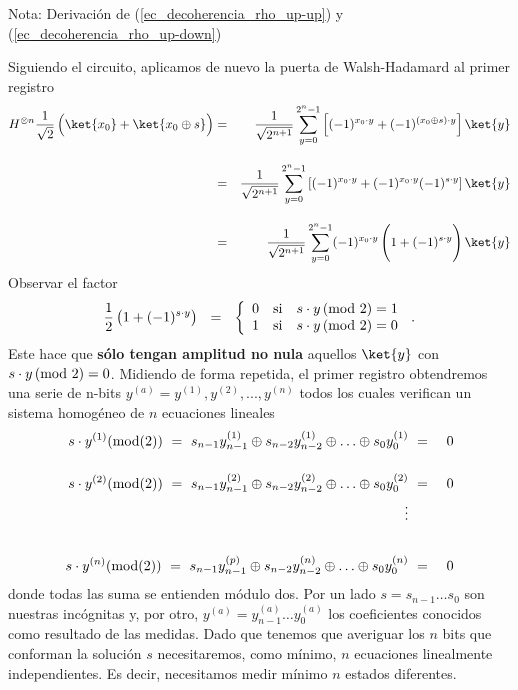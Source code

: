 \documentclass[a4paper,11pt]{book} %
\numberwithin{equation}{chapter}
\begin{document}
\begin{mybox_blue}{Nota: Derivación de (\ref{ec_decoherencia_rho_up-up}) y  (\ref{ec_decoherencia_rho_up-down})}
\begin{itemize}
	Siguiendo el circuito, aplicamos de nuevo la puerta de Walsh-Hadamard al primer registro 
	\begin{eqnarray}
	H^{\otimes n} \frac{1}{\sqrt{2}} \left( \rule{0mm}{4mm} \ket{x_0} + \ket{x_0 \oplus s} \right) &=& \frac{1}{\sqrt{2^{n+1}}} \sum_{y=0}^{2^n-1} \left[ (-1)^{x_0\cdot y} + (-1)^{(x_0\oplus s) \cdot y}\right]  \ket{y} \nonumber\\ 	\rule{0mm}{10mm}
	&=& \frac{1}{\sqrt{2^{n+1}}} \sum_{y=0}^{2^n-1} \left[ (-1)^{x_0\cdot y} + (-1)^{x_0 \cdot y}(-1)^{ s \cdot y}\right]  \ket{y} \nonumber\\ \rule{0mm}{10mm}
	&=&  \frac{1}{\sqrt{2^{n+1}}} \sum_{y=0}^{2^n-1}(-1)^{x_0\cdot y}  \left( \rule{0mm}{6mm} 1+ (-1)^{s \cdot y}\right) \ket{y}
	\end{eqnarray}
	Observar  el factor 
	$$
	\frac{1}{2}\left( \rule{0mm}{3mm} 1+ (-1)^{s \cdot y}\right)~~ = ~~ 
	\left\{\begin{array}{ccc} 0 &\hbox{si}&  s \cdot y\, (\hbox{mod 2}) = 1 \\ 
	1 &\hbox{si} & s\cdot y\, (\hbox{mod 2}) = 0\end{array}
	\right.  \,.
	$$ 
	Este hace que \textbf{sólo tengan amplitud no nula} aquellos  $\ket{y}$ con $s\cdot y\,  (\hbox{mod 2})= 0$. Midiendo de forma repetida, el primer registro obtendremos una serie de n-bits $ y^{(a)} = y^{(1)},y^{(2)},...,y^{(n)}$ todos los cuales  verifican un sistema homogéneo de $n$ ecuaciones lineales 
	\begin{eqnarray}
	s\cdot y^{(1)} (\hbox{mod(2)})~=~ s_{n-1}y^{(1)}_{n-1} \oplus s_{n-2}y^{(1)}_{n-2} \oplus \ldots \oplus s_0 y^{(1)}_0  &~=~& 0 \nonumber\\ \rule{0mm}{8mm}
	s\cdot y^{(2)} (\hbox{mod(2)}) ~=~ s_{n-1}y^{(2)}_{n-1} \oplus s_{n-2}y^{(2)}_{n-2} \oplus \ldots \oplus s_0 y^{(2)}_0 &~=~& 0 \nonumber\\
	\vdots & & \nonumber\\ \rule{0mm}{10mm}
	s\cdot y^{(n)} (\hbox{mod(2)}) ~=~ s_{n-1}y^{(p)}_{n-1} \oplus s_{n-2}y^{(n)}_{n-2} \oplus \ldots \oplus s_0 y^{(n)}_0 &~=~& 0 \nonumber\\
	\end{eqnarray}
	donde todas las suma se entienden módulo dos. Por un lado $s=s_{n-1}\ldots s_0$ son nuestras incógnitas y, por otro, $y^{(a)} = y^{(a)}_{n-1}\ldots y^{(a)}_0$ los coeficientes conocidos como resultado de las medidas. Dado que tenemos que averiguar los $n$ bits que conforman la solución $s$ necesitaremos, como mínimo, $n$ ecuaciones linealmente independientes. Es decir, necesitamos medir mínimo $n$ estados diferentes.
	

\end{itemize}
\end{mybox_blue}
\end{document}

